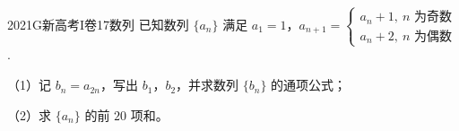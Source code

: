 
\begin{problem}{2021}{G}{新高考I卷}{17}{数列}
已知数列 $ \{a_n\} $ 满足 $ a_1=1 $，$ a_{n+1}=\begin{cases}
a_n+1,\ n\text{ 为奇数}\\
a_n+2,\ n\text{ 为偶数}
\end{cases} $.

（1）记 $ b_n=a_{2n} $，写出 $ b_1 $，$ b_2 $，并求数列 $ \{b_n\} $ 的通项公式；

（2）求 $ \{a_n\} $ 的前 $ 20 $ 项和。
\end{problem}

\begin{answer}

\end{answer}

\begin{solutions}

\end{solutions}